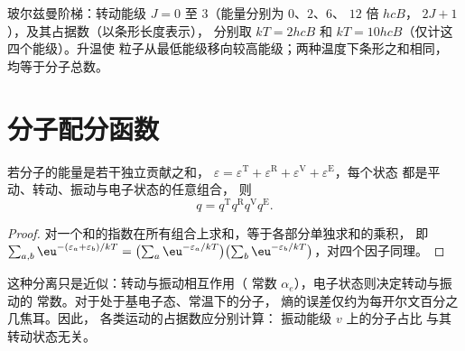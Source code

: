 \begin{omfigure}

{\small 玻尔兹曼阶梯：转动能级 $J = 0$ 至 3（能量分别为 $0$、$2$、$6$、
$12$ 倍 $hcB$， $2J + 1$），及其占据数（以条形长度表示），
分别取 $kT = 2hcB$ 和 $kT = 10hcB$（仅计这四个能级）。升温使
粒子从最低能级移向较高能级；两种温度下条形之和相同，
均等于分子总数。}
\end{omfigure}

\section{分子配分函数}

\begin{proposition}[因子分解]\label{prop:b3:partition-functions:factorisation}
若分子的能量是若干独立贡献之和，
$\varepsilon = \varepsilon^{\mathrm T} + \varepsilon^{\mathrm R} + \varepsilon^{\mathrm V} + \varepsilon^{\mathrm E}$，每个状态
都是平动、转动、振动与电子状态的任意组合，
则
\[
  q = q^{\mathrm T}q^{\mathrm R}q^{\mathrm V}q^{\mathrm E}.
\]
\end{proposition}

\begin{proof}
对一个和的指数在所有组合上求和，等于各部分单独求和的乘积，
即 $\sum_{a,b}\eu^{-(\varepsilon_a+\varepsilon_b)/kT} = \bigl(\sum_a\eu^{-\varepsilon_a/kT}\bigr)
\bigl(\sum_b\eu^{-\varepsilon_b/kT}\bigr)$，对四个因子同理。
\end{proof}

这种分离只是近似：转动与振动相互作用（
常数 $\alpha_e$），电子状态则决定转动与振动的
常数。对于处于基电子态、常温下的分子，
熵的误差仅约为每开尔文百分之几焦耳。因此，
各类运动的占据数应分别计算：
振动能级 $v$ 上的分子占比
与其转动状态无关。

